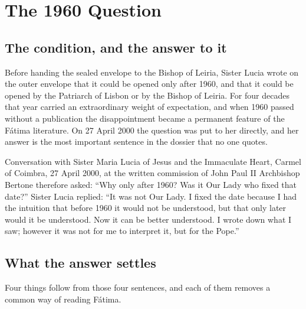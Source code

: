 \section{The 1960 Question}\label{sec:1960}

\subsection{The condition, and the answer to it}

Before handing the sealed envelope to the Bishop of Leiria, Sister
Lucia wrote on the outer envelope that it could be opened only after
1960, and that it could be opened by the Patriarch of Lisbon or by
the Bishop of Leiria. For four decades that year carried an
extraordinary weight of expectation, and when 1960 passed without a
publication the disappointment became a permanent feature of the
F\'atima literature. On 27 April 2000 the question was put to her
directly, and her answer is the most important sentence in the
dossier that no one quotes.

\begin{operativetext}{Conversation with Sister Maria Lucia of Jesus
and the Immaculate Heart, Carmel of Coimbra, 27 April 2000, at the
written commission of John Paul II}
Archbishop Bertone therefore asked: ``Why only after 1960? Was it Our
Lady who fixed that date?'' Sister Lucia replied: ``It was not Our
Lady. I fixed the date because I had the intuition that before 1960
it would not be understood, but that only later would it be
understood. Now it can be better understood. I wrote down what I saw;
however it was not for me to interpret it, but for the
Pope.''
\end{operativetext}

\subsection{What the answer settles}

Four things follow from those four sentences, and each of them
removes a common way of reading F\'atima.

